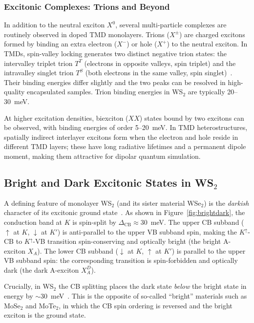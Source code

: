 \subsubsection{Excitonic Complexes: Trions and Beyond}

In addition to the neutral exciton $X^0$, several multi-particle complexes are routinely observed in doped TMD monolayers.
Trions ($X^\pm$) are charged excitons formed by binding an extra electron ($X^-$) or hole ($X^+$) to the neutral exciton.
In TMDs, spin-valley locking generates two distinct negative trion states: the intervalley triplet trion $T^T$ (electrons in opposite valleys, spin triplet) and the intravalley singlet trion $T^S$ (both electrons in the same valley, spin singlet)~\cite{zinkiewicz-2021}.
Their binding energies differ slightly and the two peaks can be resolved in high-quality encapsulated samples.
Trion binding energies in WS$_2$ are typically 20--30~meV.

At higher excitation densities, biexciton ($XX$) states bound by two excitons can be observed, with binding energies of order 5--20~meV.
In TMD heterostructures, spatially indirect interlayer excitons form when the electron and hole reside in different TMD layers; these have long radiative lifetimes and a permanent dipole moment, making them attractive for dipolar quantum simulation.

\subsection{Bright and Dark Excitonic States in WS$_2$}
\label{sec:brightdark_wse2}

A defining feature of monolayer WS$_2$ (and its sister material WSe$_2$) is the \textit{darkish} character of its excitonic ground state~\cite{molas2017optical}.
As shown in Figure~\ref{fig:brightdark}, the conduction band at $K$ is spin-split by $\Delta_\mathrm{CB} \approx 30$~meV.
The upper CB subband ($\uparrow$ at $K$, $\downarrow$ at $K'$) is anti-parallel to the upper VB subband spin, making the $K^\uparrow$-CB to $K^\uparrow$-VB transition spin-conserving and optically bright (the bright A-exciton $X_A$).
The lower CB subband ($\downarrow$ at $K$, $\uparrow$ at $K'$) is parallel to the upper VB subband spin: the corresponding transition is spin-forbidden and optically dark (the dark A-exciton $X_A^D$).

Crucially, in WS$_2$ the CB splitting places the dark state \textit{below} the bright state in energy by $\sim$30~meV~\cite{kormanyos-2015}.
This is the opposite of so-called ``bright'' materials such as MoSe$_2$ and MoTe$_2$, in which the CB spin ordering is reversed and the bright exciton is the ground state.

